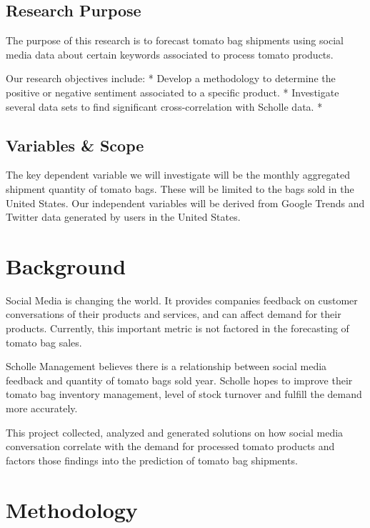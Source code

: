 \documentclass[12pt,oneside]{chicagocapstone}
\begin{document}
\section*{Research Purpose}\label{research_purpose}

The purpose of this research is to forecast tomato bag shipments using
social media data about certain keywords associated to process tomato
products.

Our research objectives include: * Develop a methodology to determine
the positive or negative sentiment associated to a specific product. *
Investigate several data sets to find significant cross-correlation with
Scholle data. *

\section*{Variables \& Scope}\label{variables_scope}

The key dependent variable we will investigate will be the monthly
aggregated shipment quantity of tomato bags. These will be limited to
the bags sold in the United States. Our independent variables will be
derived from Google Trends and Twitter data generated by users in the
United States.

\chapter*{Background}\label{background}

Social Media is changing the world. It provides companies feedback on
customer conversations of their products and services, and can affect
demand for their products. Currently, this important metric is not
factored in the forecasting of tomato bag sales.

Scholle Management believes there is a relationship between social media
feedback and quantity of tomato bags sold year. Scholle hopes to improve
their tomato bag inventory management, level of stock turnover and
fulfill the demand more accurately.

This project collected, analyzed and generated solutions on how social
media conversation correlate with the demand for processed tomato
products and factors those findings into the prediction of tomato bag
shipments.

\chapter*{Methodology}\label{methodology}
\end{document}

